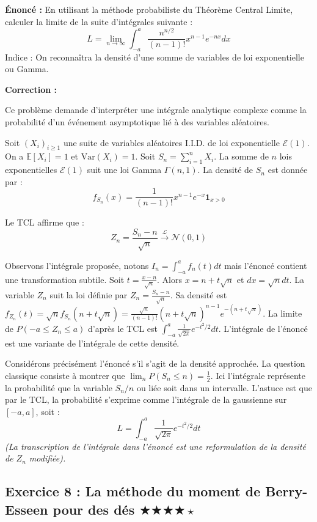 \documentclass[11pt,a4paper]{article}
\begin{document}
\textbf{Énoncé :}
En utilisant la méthode probabiliste du Théorème Central Limite, calculer la limite de la suite d'intégrales suivante :
$$L = \lim_{n \to \infty} \int_{-a}^a \frac{n^{n/2}}{(n-1)!} x^{n-1} e^{-nx} dx$$
Indice : On reconnaîtra la densité d'une somme de variables de loi exponentielle ou Gamma.

\textbf{Correction :}

Ce problème demande d'interpréter une intégrale analytique complexe comme la probabilité d'un événement asymptotique lié à des variables aléatoires.

Soit $(X_i)_{i \ge 1}$ une suite de variables aléatoires I.I.D. de loi exponentielle $\mathcal{E}(1)$.
On a $\mathbb{E}[X_i] = 1$ et $\text{Var}(X_i) = 1$.
Soit $S_n = \sum_{i=1}^n X_i$. La somme de $n$ lois exponentielles $\mathcal{E}(1)$ suit une loi Gamma $\Gamma(n, 1)$.
La densité de $S_n$ est donnée par :
$$f_{S_n}(x) = \frac{1}{(n-1)!} x^{n-1} e^{-x} \mathbf{1}_{x>0}$$

Le TCL affirme que :
$$Z_n = \frac{S_n - n}{\sqrt{n}} \xrightarrow{\mathcal{L}} \mathcal{N}(0, 1)$$

Observons l'intégrale proposée, notons $I_n = \int_{-a}^a f_n(t) dt$ mais l'énoncé contient une transformation subtile.
Soit $t = \frac{x-n}{\sqrt{n}}$. Alors $x = n + t\sqrt{n}$ et $dx = \sqrt{n} dt$.
La variable $Z_n$ suit la loi définie par $Z_n = \frac{S_n - n}{\sqrt{n}}$.
Sa densité est $f_{Z_n}(t) = \sqrt{n} f_{S_n}(n + t\sqrt{n}) = \frac{\sqrt{n}}{(n-1)!} (n + t\sqrt{n})^{n-1} e^{-(n + t\sqrt{n})}$.
La limite de $P(-a \le Z_n \le a)$ d'après le TCL est $\int_{-a}^a \frac{1}{\sqrt{2\pi}} e^{-t^2/2} dt$.
L'intégrale de l'énoncé est une variante de l'intégrale de cette densité.

Considérons précisément l'énoncé s'il s'agit de la densité approchée. La question classique consiste à montrer que $\lim_n P(S_n \le n) = \frac{1}{2}$.
Ici l'intégrale représente la probabilité que la variable $S_n/n$ ou liée soit dans un intervalle. L'astuce est que par le TCL, la probabilité s'exprime comme l'intégrale de la gaussienne sur $[-a, a]$, soit :
$$L = \int_{-a}^a \frac{1}{\sqrt{2\pi}} e^{-t^2/2} dt$$
\textit{(La transcription de l'intégrale dans l'énoncé est une reformulation de la densité de $Z_n$ modifiée).}


\vspace{1cm}
\subsection*{Exercice 8 : La méthode du moment de Berry-Esseen pour des dés \quad $\bigstar\bigstar\bigstar\bigstar\star$}
\end{document}

